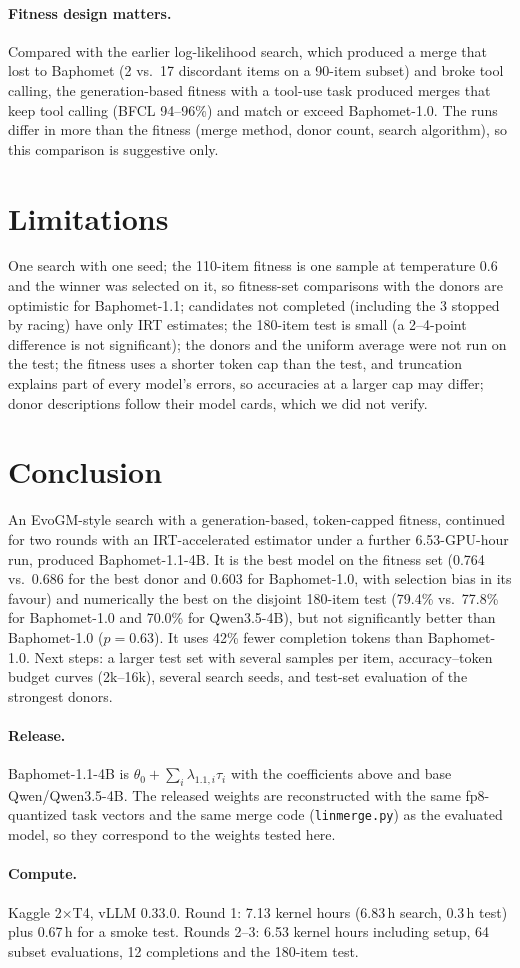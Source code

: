 \paragraph{Fitness design matters.} Compared with the earlier log-likelihood search, which produced a merge that lost to Baphomet (2 vs.\ 17 discordant items on a 90-item subset) and broke tool calling, the generation-based fitness with a tool-use task produced merges that keep tool calling (BFCL 94--96\%) and match or exceed Baphomet-1.0. The runs differ in more than the fitness (merge method, donor count, search algorithm), so this comparison is suggestive only.

\section{Limitations}
One search with one seed; the 110-item fitness is one sample at temperature 0.6 and the winner was selected on it, so fitness-set comparisons with the donors are optimistic for Baphomet-1.1; candidates not completed (including the 3 stopped by racing) have only IRT estimates; the 180-item test is small (a 2--4-point difference is not significant); the donors and the uniform average were not run on the test; the fitness uses a shorter token cap than the test, and truncation explains part of every model's errors, so accuracies at a larger cap may differ; donor descriptions follow their model cards, which we did not verify.

\section{Conclusion}
An EvoGM-style search with a generation-based, token-capped fitness, continued for two rounds with an IRT-accelerated estimator under a further 6.53-GPU-hour run, produced Baphomet-1.1-4B. It is the best model on the fitness set (0.764 vs.\ 0.686 for the best donor and 0.603 for Baphomet-1.0, with selection bias in its favour) and numerically the best on the disjoint 180-item test (79.4\% vs.\ 77.8\% for Baphomet-1.0 and 70.0\% for Qwen3.5-4B), but not significantly better than Baphomet-1.0 ($p=0.63$). It uses 42\% fewer completion tokens than Baphomet-1.0. Next steps: a larger test set with several samples per item, accuracy--token budget curves (2k--16k), several search seeds, and test-set evaluation of the strongest donors.

\paragraph{Release.} Baphomet-1.1-4B is $\theta_0+\sum_i\lambda_{1.1,i}\tau_i$ with the coefficients above and base Qwen/Qwen3.5-4B. The released weights are reconstructed with the same fp8-quantized task vectors and the same merge code (\texttt{linmerge.py}) as the evaluated model, so they correspond to the weights tested here.

\paragraph{Compute.} Kaggle 2$\times$T4, vLLM 0.33.0. Round 1: 7.13 kernel hours (6.83\,h search, 0.3\,h test) plus 0.67\,h for a smoke test. Rounds 2--3: 6.53 kernel hours including setup, 64 subset evaluations, 12 completions and the 180-item test.

